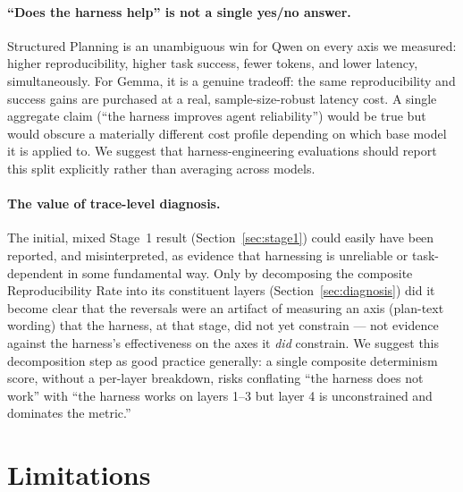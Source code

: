 \documentclass[11pt]{article}
\begin{document}
\paragraph{``Does the harness help'' is not a single yes/no answer.} Structured Planning is an unambiguous win for Qwen on every axis we measured: higher reproducibility, higher task success, fewer tokens, and lower latency, simultaneously. For Gemma, it is a genuine tradeoff: the same reproducibility and success gains are purchased at a real, sample-size-robust latency cost. A single aggregate claim (``the harness improves agent reliability'') would be true but would obscure a materially different cost profile depending on which base model it is applied to. We suggest that harness-engineering evaluations should report this split explicitly rather than averaging across models.

\paragraph{The value of trace-level diagnosis.} The initial, mixed Stage~1 result (Section~\ref{sec:stage1}) could easily have been reported, and misinterpreted, as evidence that harnessing is unreliable or task-dependent in some fundamental way. Only by decomposing the composite Reproducibility Rate into its constituent layers (Section~\ref{sec:diagnosis}) did it become clear that the reversals were an artifact of measuring an axis (plan-text wording) that the harness, at that stage, did not yet constrain --- not evidence against the harness's effectiveness on the axes it \emph{did} constrain. We suggest this decomposition step as good practice generally: a single composite determinism score, without a per-layer breakdown, risks conflating ``the harness does not work'' with ``the harness works on layers 1--3 but layer 4 is unconstrained and dominates the metric.''

\section{Limitations}
\end{document}
